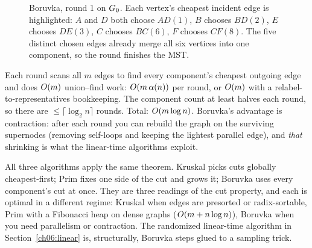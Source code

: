 \begin{figure}[H]
\centering
{}
\caption{Boruvka, round 1 on $G_0$. Each vertex's cheapest incident edge is highlighted: $A$ and $D$ both choose $AD(1)$, $B$ chooses $BD(2)$, $E$ chooses $DE(3)$, $C$ chooses $BC(6)$, $F$ chooses $CF(8)$. The five distinct chosen edges already merge all six vertices into one component, so the round finishes the MST.}
\label{ch06:boruvka-round}
\end{figure}

\begin{complexitybox}
Each round scans all $m$ edges to find every component's cheapest outgoing edge and does $O(m)$ union--find work: $O(m\,\alpha(n))$ per round, or $O(m)$ with a relabel-to-representatives bookkeeping. The component count at least halves each round, so there are $\le\lceil\log_2 n\rceil$ rounds. Total: $O(m\log n)$. Boruvka's advantage is contraction: after each round you can rebuild the graph on the surviving supernodes (removing self-loops and keeping the lightest parallel edge), and \emph{that} shrinking is what the linear-time algorithms exploit.
\end{complexitybox}

\begin{aestheticbox}
All three algorithms apply the same theorem. Kruskal picks cuts globally cheapest-first; Prim fixes one side of the cut and grows it; Boruvka uses every component's cut at once. They are three readings of the cut property, and each is optimal in a different regime: Kruskal when edges are presorted or radix-sortable, Prim with a Fibonacci heap on dense graphs ($O(m+n\log n)$), Boruvka when you need parallelism or contraction. The randomized linear-time algorithm in Section~\ref{ch06:linear} is, structurally, Boruvka steps glued to a sampling trick.
\end{aestheticbox}

